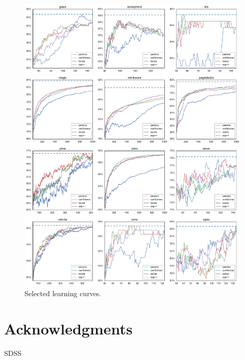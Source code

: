 \documentclass[fleqn,10pt,lineno]{wlpeerj} %
\begin{document}
\begin{figure}[tbp]
	\centering
	\includegraphics[width=\textwidth]{figures/learning_curves}
	\caption[Selected learning curves]{Selected learning curves.}
	\label{fig:learning_curves}
\end{figure}


\section*{Acknowledgments}

SDSS


\end{document}
